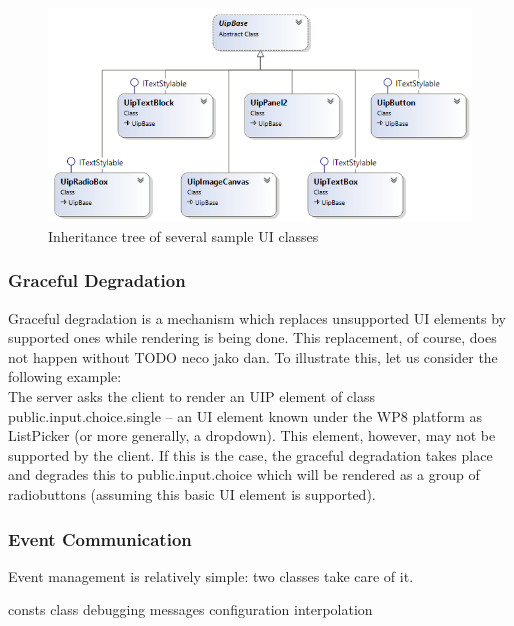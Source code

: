 \begin{figure}[ht!]
\centering
\includegraphics[width=140mm]{pics/UI_classes.png}
\caption{Inheritance tree of several sample UI classes}
\label{fig:UIclasses}
\end{figure}

\subsubsection{Graceful Degradation}
Graceful degradation is a mechanism which replaces unsupported UI elements by supported ones while rendering is being done. This replacement, of course, does not happen without TODO neco jako dan. To illustrate this, let us consider the following example:\\
The server asks the client to render an UIP element of class public.input.choice.single – an UI element known under the WP8 platform as ListPicker (or more generally, a dropdown). This element, however, may not be supported by the client. If this is the case, the graceful degradation takes place and degrades this to public.input.choice which will be rendered as a group of radiobuttons (assuming this basic UI element is supported).

\subsubsection{Event Communication}
Event management is relatively simple: two classes take care of it.



consts class
debugging messages
configuration
interpolation
